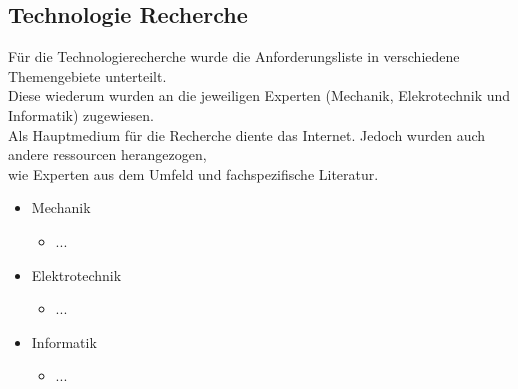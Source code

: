 \documentclass[../../main.tex]{subfiles}
\begin{document}
\subsection{Technologie Recherche}
Für die Technologierecherche wurde die Anforderungsliste in verschiedene Themengebiete unterteilt. \\
Diese wiederum wurden an die jeweiligen Experten (Mechanik, Elekrotechnik und Informatik) zugewiesen. \\
Als Hauptmedium für die Recherche diente das Internet. Jedoch wurden auch andere ressourcen herangezogen, \\
wie Experten aus dem Umfeld und fachspezifische Literatur.

\begin{itemize}
    \item Mechanik
    \begin{itemize}
        \item ...
    \end{itemize}
    \item Elektrotechnik
    \begin{itemize}
        \item ...
      \end{itemize}
    \item Informatik
    \begin{itemize}
        \item ...
    \end{itemize}
\end{itemize}
\end{document}
